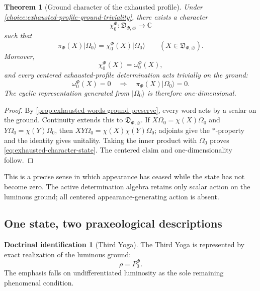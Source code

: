 \documentclass[11pt,reqno]{scrartcl}
\newcommand{\CC}{\mathbb C}
\newcommand{\piF}{\pi_{\Phi}}
\newcommand{\omegaF}{\omega_{0}^{\Phi}}
\newcommand{\PzeroF}{P_{0}^{\Phi}}
\newcommand{\ket}[1]{\lvert #1\rangle}
\newcommand{\detAlgEmpty}{\mathfrak D_{\Phi,\varnothing}}
\theoremstyle{plain}
\newtheorem{theorem}{Theorem}[section]
\theoremstyle{definition}
\newtheorem{identification}[identification]{Doctrinal identification}
\theoremstyle{remark}
\begin{document}
\begin{theorem}[Ground character of the exhausted profile]
\label{thm:exhausted-profile-character}
Under \cref{choice:exhausted-profile-ground-triviality}, there exists a
character
\begin{equation}
  \chi_0^{\Phi}:\detAlgEmpty\to\CC
  \label{eq:exhausted-ground-character}
\end{equation}
such that
\begin{equation}
  \piF(X)\ket{\Omega_0}
  =\chi_0^{\Phi}(X)\ket{\Omega_0}
  \qquad
  (X\in\detAlgEmpty).
  \label{eq:exhausted-character-action}
\end{equation}
Moreover,
\begin{equation}
  \chi_0^{\Phi}(X)=\omegaF(X),
  \label{eq:exhausted-character-state}
\end{equation}
and every centered exhausted-profile determination acts trivially on the
ground:
\begin{equation}
  \omegaF(X)=0
  \quad\Longrightarrow\quad
  \piF(X)\ket{\Omega_0}=0.
  \label{eq:centered-exhausted-annihilates-ground}
\end{equation}
The cyclic representation generated from $\ket{\Omega_0}$ is therefore
one-dimensional.
\end{theorem}

\begin{proof}
By \cref{prop:exhausted-words-ground-preserve}, every word acts by a scalar on
the ground.  Continuity extends this to $\detAlgEmpty$.  If
$X\Omega_0=\chi(X)\Omega_0$ and $Y\Omega_0=\chi(Y)\Omega_0$, then
$XY\Omega_0=\chi(X)\chi(Y)\Omega_0$; adjoints give the $*$-property and the
identity gives unitality.  Taking the inner product with $\Omega_0$ proves
\eqref{eq:exhausted-character-state}.  The centered claim and
one-dimensionality follow.
\end{proof}

This is a precise sense in which appearance has ceased while the state has
not become zero.  The active determination algebra retains only scalar action
on the luminous ground; all centered appearance-generating action is absent.

\subsection{One state, two praxeological descriptions}

\begin{identification}[Third Yoga]
\label{id:third-yoga}
The Third Yoga is represented by exact realization of the luminous ground:
\begin{equation}
  \rho=\PzeroF.
  \label{eq:third-yoga-ground-state}
\end{equation}
The emphasis falls on undifferentiated luminosity as the sole remaining
phenomenal condition.
\end{identification}
\end{document}
